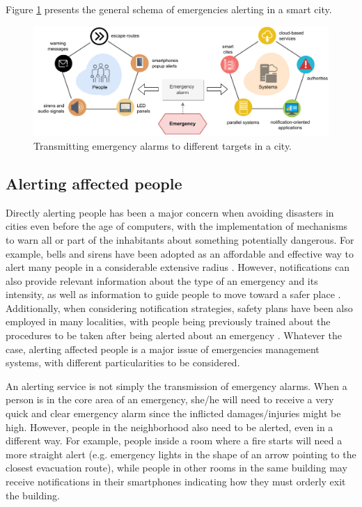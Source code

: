 \begin{refsection}
Figure \ref{Fig:notifications} presents the general schema of emergencies alerting in a smart city.

\begin{figure}[htbp]
\centering
\includegraphics[scale=0.75]{Chapters/1-Survey/images/notifications.pdf}
\caption{Transmitting emergency alarms to different targets in a city.}
\label{Fig:notifications}
\end{figure}

\subsection {Alerting affected people}

Directly alerting people has been a major concern when avoiding disasters in cities even before the age of computers, with the implementation of mechanisms to warn all or part of the inhabitants about something potentially dangerous. For example, bells and sirens have been adopted as an affordable and effective way to alert many people in a considerable extensive radius \cite{socialmedia5,citiesemergencies1}. However, notifications can also provide relevant information about the type of an emergency and its intensity, as well as information to guide people to move toward a safer place \cite{emergenciesmetric2}. Additionally, when considering notification strategies, safety plans have been also employed in many localities, with people being previously trained about the procedures to be taken after being alerted about an emergency \cite{quakeculture,citiesdisasters2}. Whatever the case, alerting affected people is a major issue of emergencies management systems, with different particularities to be considered. 

An alerting service is not simply the transmission of emergency alarms. When a person is in the core area of an emergency, she/he will need to receive a very quick and clear emergency alarm since the inflicted damages/injuries might be high. However, people in the neighborhood also need to be alerted, even in a different way. For example, people inside a room where a fire starts will need a more straight alert (e.g. emergency lights in the shape of an arrow pointing to the closest evacuation route), while people in other rooms in the same building may receive notifications in their smartphones indicating how they must orderly exit the building. 


\end{refsection}
